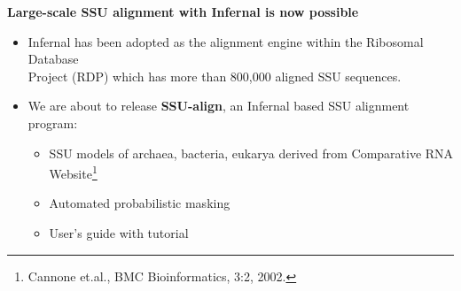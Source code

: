 \documentclass[landscape]{slides}
\begin{document}
\begin{slide}
\begin{center}
\textbf{Large-scale SSU alignment with Infernal is now possible}
\end{center}
\medskip

\small
\begin{itemize}
\item Infernal has been adopted as the alignment engine within the
  Ribosomal Database \\ Project (RDP) which has more than 800,000 aligned
  SSU sequences.

\item We are about to release {\bf SSU-align}, an Infernal based SSU alignment program:
  \begin{itemize}
    \item SSU models of archaea, bacteria, eukarya derived from
      Comparative RNA Website\footnote{Cannone et.al., BMC Bioinformatics, 3:2, 2002.}
    \item Automated probabilistic masking
    \item User's guide with tutorial
  \end{itemize}
\end{itemize}

\vfill
\end{slide}
\end{document}
